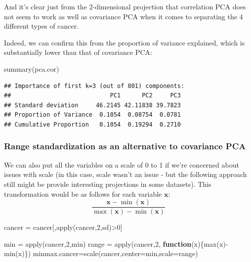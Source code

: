 \documentclass[
]{article}
\newenvironment{Shaded}{\begin{snugshade}}{\end{snugshade}}
\newcommand{\AttributeTok}[1]{\textcolor[rgb]{0.77,0.63,0.00}{#1}}
\newcommand{\ControlFlowTok}[1]{\textcolor[rgb]{0.13,0.29,0.53}{\textbf{#1}}}
\newcommand{\DecValTok}[1]{\textcolor[rgb]{0.00,0.00,0.81}{#1}}
\newcommand{\FunctionTok}[1]{\textcolor[rgb]{0.00,0.00,0.00}{#1}}
\newcommand{\NormalTok}[1]{#1}
\newcommand{\OtherTok}[1]{\textcolor[rgb]{0.56,0.35,0.01}{#1}}
\newcommand{\SpecialCharTok}[1]{\textcolor[rgb]{0.00,0.00,0.00}{#1}}
\theoremstyle{definition}
\theoremstyle{definition}
\theoremstyle{definition}
\theoremstyle{definition}
\theoremstyle{remark}
\begin{document}
And it's clear just from the 2-dimensional projection that correlation PCA does not seem to work as well as covariance PCA when it comes to separating the 4 different types of cancer.

Indeed, we can confirm this from the proportion of variance explained, which is substantially lower than that of covariance PCA:

\begin{Shaded}
\begin{Highlighting}[]
\FunctionTok{summary}\NormalTok{(pca.cor)}
\end{Highlighting}
\end{Shaded}

\begin{verbatim}
## Importance of first k=3 (out of 801) components:
##                            PC1      PC2     PC3
## Standard deviation     46.2145 42.11838 39.7823
## Proportion of Variance  0.1054  0.08754  0.0781
## Cumulative Proportion   0.1054  0.19294  0.2710
\end{verbatim}

\hypertarget{range-standardization-as-an-alternative-to-covariance-pca}{%
\subsubsection{Range standardization as an alternative to covariance PCA}\label{range-standardization-as-an-alternative-to-covariance-pca}}

We can also put all the variables on a scale of 0 to 1 if we're concerned about issues with scale (in this case, scale wasn't an issue - but the following approach still might be provide interesting projections in some datasets). This transformation would be as follows for each variable \(\mathbf{x}\):
\[\frac{\mathbf{x} - \min(\mathbf{x})}{\max(\mathbf{x})-\min(\mathbf{x})}\]

\begin{Shaded}
\begin{Highlighting}[]
\NormalTok{cancer }\OtherTok{=}\NormalTok{ cancer[,}\FunctionTok{apply}\NormalTok{(cancer,}\DecValTok{2}\NormalTok{,sd)}\SpecialCharTok{\textgreater{}}\DecValTok{0}\NormalTok{]}

\NormalTok{min }\OtherTok{=} \FunctionTok{apply}\NormalTok{(cancer,}\DecValTok{2}\NormalTok{,min)}
\NormalTok{range }\OtherTok{=}   \FunctionTok{apply}\NormalTok{(cancer,}\DecValTok{2}\NormalTok{, }\ControlFlowTok{function}\NormalTok{(x)\{}\FunctionTok{max}\NormalTok{(x)}\SpecialCharTok{{-}}\FunctionTok{min}\NormalTok{(x)\})}
\NormalTok{minmax.cancer}\OtherTok{=}\FunctionTok{scale}\NormalTok{(cancer,}\AttributeTok{center=}\NormalTok{min,}\AttributeTok{scale=}\NormalTok{range)  }
\end{Highlighting}
\end{Shaded}
\end{document}
